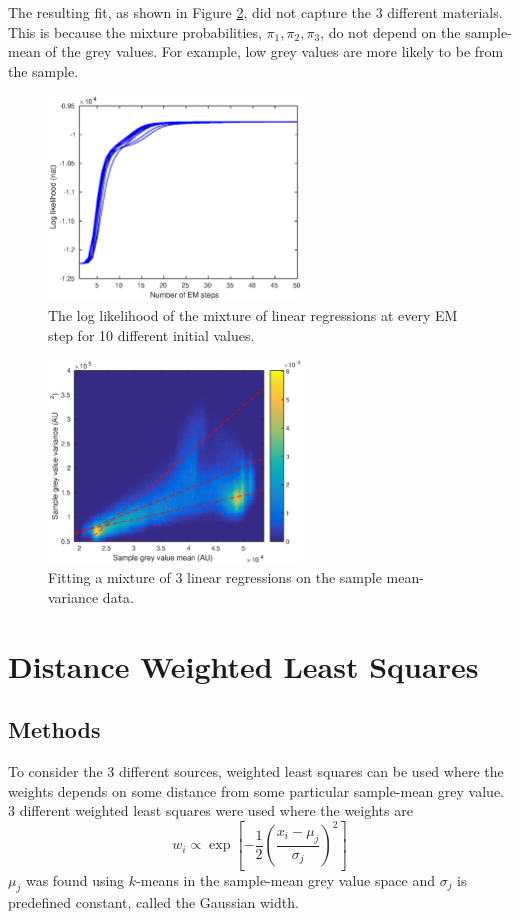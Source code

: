 \documentclass[12pt]{report}
\begin{document}
The resulting fit, as shown in Figure \ref{fig:mixture_histogram}, did not capture the 3 different materials. This is because the mixture probabilities, $\pi_1,\pi_2,\pi_3$, do not depend on the sample-mean of the grey values. For example, low grey values are more likely to be from the sample.

\begin{figure}
	\centering	
	\includegraphics[width=0.6\textwidth]{figures/meanVar/mixture_lnL.eps}
	\caption{The log likelihood of the mixture of linear regressions at every EM step for 10 different initial values.}
	\label{fig:mixture_lnL}
\end{figure}

\begin{figure}
	\centering	
	\includegraphics[width=0.6\textwidth]{figures/meanVar/mixture_histogram.eps}
	\caption{Fitting a mixture of 3 linear regressions on the sample mean-variance data.}
	\label{fig:mixture_histogram}
\end{figure}

\section{Distance Weighted Least Squares}
\subsection{Methods}
To consider the 3 different sources, weighted least squares can be used where the weights depends on some distance from some particular sample-mean grey value. 3 different weighted least squares were used where the weights are
\begin{equation}
w_i\propto\exp\left[-\frac{1}{2}\left(\frac{x_i-\mu_j}{\sigma_j}\right)^2\right]
\end{equation}
$\mu_j$ was found using $k$-means in the sample-mean grey value space and $\sigma_j$ is predefined constant, called the Gaussian width.
\end{document}
